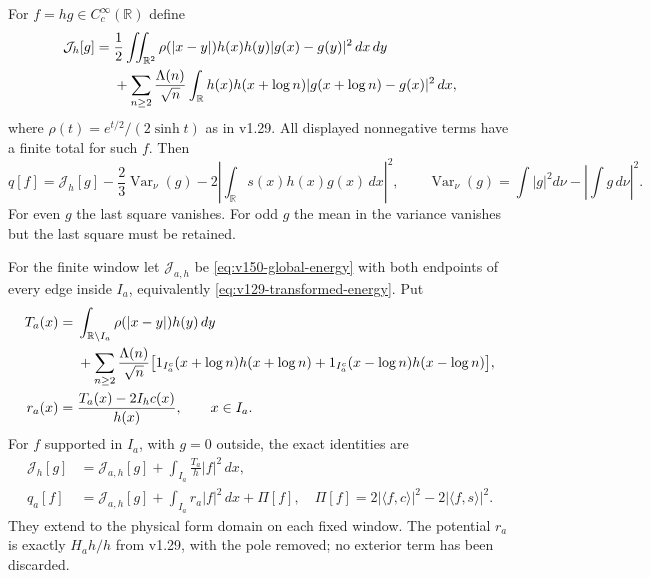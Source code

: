 \begin{proposition}
\label{prop:v150-critical-energy}
For $f=hg\in C_c^\infty(\mathbb R)$ define
\begin{align}
 \mathcal J_h[g]={}&\frac12\iint_{\mathbb R^2}
       \rho(|x-y|)h(x)h(y)|g(x)-g(y)|^2\,dx\,dy\notag\\
 &+\sum_{n\ge2}\frac{\Lambda(n)}{\sqrt n}
       \int_{\mathbb R}h(x)h(x+\log n)
                    |g(x+\log n)-g(x)|^2\,dx,
 \label{eq:v150-global-energy}
\end{align}
where $\rho(t)=e^{t/2}/(2\sinh t)$ as in v1.29. All displayed
nonnegative terms have a finite total for such $f$. Then
\begin{equation}\label{eq:v150-critical-identity}
 q[f]=\mathcal J_h[g]-\frac23\operatorname{Var}_{\nu}(g)
                 -2\left|\int_{\mathbb R}s(x)h(x)g(x)\,dx\right|^2,
 \qquad
 \operatorname{Var}_{\nu}(g)=\int|g|^2d\nu-\left|\int g\,d\nu\right|^2.
\end{equation}
For even $g$ the last square vanishes. For odd $g$ the mean in the
variance vanishes but the last square must be retained.

For the finite window let $\mathcal J_{a,h}$ be
\eqref{eq:v150-global-energy} with both endpoints of every edge inside
$I_a$, equivalently \eqref{eq:v129-transformed-energy}. Put
\begin{align}
 T_a(x)={}&\int_{\mathbb R\setminus I_a}\rho(|x-y|)h(y)\,dy\notag\\
 &+\sum_{n\ge2}\frac{\Lambda(n)}{\sqrt n}
 \bigl[1_{I_a^c}(x+\log n)h(x+\log n)
       +1_{I_a^c}(x-\log n)h(x-\log n)\bigr],\label{eq:v150-exterior}\\
 r_a(x)={}&\frac{T_a(x)-2I_hc(x)}{h(x)},\qquad x\in I_a.
 \label{eq:v150-potential}
\end{align}
For $f$ supported in $I_a$, with $g=0$ outside, the exact identities are
\begin{align}
 \mathcal J_h[g]&=\mathcal J_{a,h}[g]
                +\int_{I_a}\frac{T_a}{h}|f|^2\,dx,\label{eq:v150-edge-split}\\
 q_a[f]&=\mathcal J_{a,h}[g]+\int_{I_a}r_a|f|^2\,dx+\Pi[f],
 \quad \Pi[f]=2|\langle f,c\rangle|^2-2|\langle f,s\rangle|^2.
 \label{eq:v150-local-identity}
\end{align}
They extend to the physical form domain on each fixed window.
The potential $r_a$ is exactly $H_a h/h$ from v1.29, with the pole
removed; no exterior term has been discarded.
\end{proposition}
